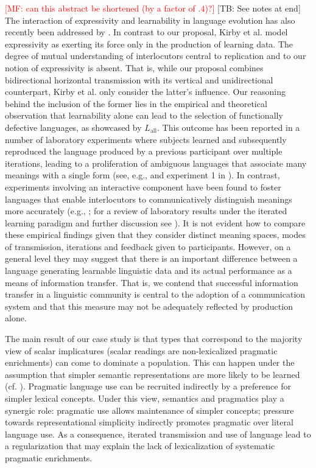 \documentclass[a4paper, 11pt]{article}
\theoremstyle{Satz}
\newcommand{\mf}[1]{\textcolor{Red}{[MF: #1]}}
\newcommand{\tb}[1]{\textcolor[rgb]{.8,.33,.0}{[TB: #1]}}%
\newcommand{\mylang}[1]{\ensuremath{L_{\text{#1}}}\xspace} %
\newcommand{\Lall}{\mylang{all}}
\begin{document}
\mf{can this abstract be shortened (by a factor of $.4$)?} \tb{See notes at end} The interaction of expressivity and
learnability in language evolution has also recently been addressed by
\citet{kirby+etal:2015}. In contrast to our proposal, Kirby et al. model expressivity as
exerting its force only in the production of learning data. The degree of mutual understanding
of interlocutors central to replication and to our notion of expressivity is absent. That is,
while our proposal combines bidirectional horizontal transmission with its vertical and
unidirectional counterpart, Kirby et al. only consider the latter's influence. Our reasoning
behind the inclusion of the former lies in the empirical and theoretical observation that
learnability alone can lead to the selection of functionally defective languages, as showcased
by $\Lall$. This outcome has been reported in a number of laboratory experiments where subjects
learned and subsequently reproduced the language produced by a previous participant over
multiple iterations, leading to a proliferation of ambiguous languages that associate many
meanings with a single form (see, e.g., \citealt{silvey+etal:2014} and experiment 1 in
\citealt{kirby+etal:2008}). In contrast, experiments involving an interactive component have
been found to foster languages that enable interlocutors to communicatively distinguish
meanings more accurately (e.g., \citealt{fay+etal:2013}; for a review of laboratory results
under the iterated learning paradigm and further discussion see \citealt{kirby+etal:2015,
  tamariz+kirby:2016}). It is not evident how to compare these empirical findings given that
they consider distinct meaning spaces, modes of transmission, iterations and feedback given to
participants. However, on a general level they may suggest that there is an important
difference between a language generating learnable linguistic data and its actual performance
as a means of information transfer. That is, we contend that successful information transfer in
a linguistic community is central to the adoption of a communication system and that this
measure may not be adequately reflected by production alone.

The main result of our case study is that types that correspond to the majority view of scalar
implicatures (scalar readings are non-lexicalized pragmatic enrichments) can come to dominate a
population. This can happen under the assumption that simpler semantic representations are more
likely to be learned (cf. \citealt{chater+vitanyi:2003}). Pragmatic language use can be
recruited indirectly by a preference for simpler lexical concepts. Under this view, semantics
and pragmatics play a synergic role: pragmatic use allows maintenance of simpler concepts;
pressure towards representational simplicity indirectly promotes pragmatic over literal
language use. As a consequence, iterated transmission and use of language lead to a
regularization that may explain the lack of lexicalization of systematic pragmatic enrichments.
\end{document}
